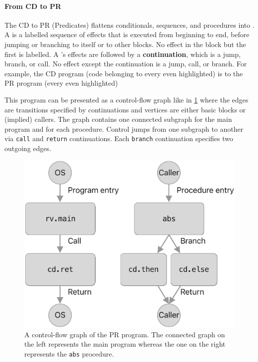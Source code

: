 \documentclass[main.tex]{subfiles}
\begin{document}
\paragraph{From CD to PR} The CD to PR (Predicates)  flattens conditionals, sequences, and procedures into . A \textbf{} is a labelled sequence of effects that is executed from beginning to end, before jumping or branching to itself or to other blocks. No effect in the block but the first is labelled. A 's effects are followed by a \textbf{continuation}, which is a jump, branch, or call. No effect except the continuation is a jump, call, or branch. For example, the CD program (code belonging to every even  highlighted)
is \lowered{} to the PR program (every even  highlighted)

This program can be presented as a control-flow graph like in \cref{fig:cfg} where the edges are transitions specified by continuations and vertices are either basic blocks or (implied) callers. The graph contains one connected subgraph for the main program and for each procedure. Control jumps from one subgraph to another via \texttt{call} and \texttt{return} continuations. Each \texttt{branch} continuation specifies two outgoing edges.
\begin{figure}
	\centering
	\includegraphics{Images/Basic Blocks.pdf}
	\caption{A control-flow graph of the PR program. The connected graph on the left represents the main program whereas the one on the right represents the \texttt{abs} procedure.}
	\label{fig:cfg}
\end{figure}
\end{document}
